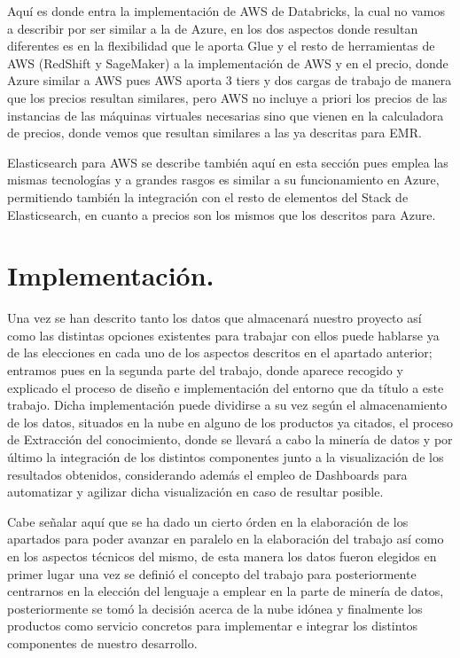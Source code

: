 \documentclass[11pt, a4paper]{article} %
\begin{document}
Aquí es donde entra la implementación de AWS de Databricks, la cual no vamos a describir por ser similar a la de Azure, en los dos aspectos donde resultan diferentes es en la flexibilidad que le aporta Glue y el resto de herramientas de AWS (RedShift y SageMaker) a la implementación de AWS y en el precio, donde Azure similar a AWS pues AWS aporta 3 tiers y dos cargas de trabajo de manera que los precios resultan similares, pero AWS no incluye a priori los precios de las instancias de las máquinas virtuales necesarias sino que vienen en la calculadora de precios, donde vemos que resultan similares a las ya descritas para EMR.


Elasticsearch para AWS se describe también aquí en esta sección pues emplea las mismas tecnologías y a grandes rasgos es similar a su funcionamiento en Azure, permitiendo también la integración con el resto de elementos del Stack de Elasticsearch, en cuanto a precios son los mismos que los descritos para Azure.
\newpage
\section{Implementación.}
Una vez se han descrito tanto los datos que almacenará nuestro proyecto así como las distintas opciones existentes para trabajar con ellos puede hablarse ya de las elecciones en cada uno de los aspectos descritos en el apartado anterior; entramos pues en la segunda parte del trabajo, donde aparece recogido y explicado el proceso de diseño e implementación del entorno que da título a este trabajo. Dicha implementación puede dividirse a su vez según el almacenamiento de los datos, situados en la nube en alguno de los productos ya citados, el proceso de Extracción del conocimiento, donde se llevará a cabo la minería de datos y por último la integración de los distintos componentes junto a la visualización de los resultados obtenidos, considerando además el empleo de Dashboards para automatizar y agilizar dicha visualización en caso de resultar posible.


Cabe señalar aquí que se ha dado un cierto órden en la elaboración de los apartados para poder avanzar en paralelo en la elaboración del trabajo así como en los aspectos técnicos del mismo, de esta manera los datos fueron elegidos en primer lugar una vez se definió el concepto del trabajo para posteriormente centrarnos en la elección del lenguaje a emplear en la parte de minería de datos, posteriormente se tomó la decisión acerca de la nube idónea y finalmente los productos como servicio concretos para implementar e integrar los distintos componentes de nuestro desarrollo.
\end{document}
